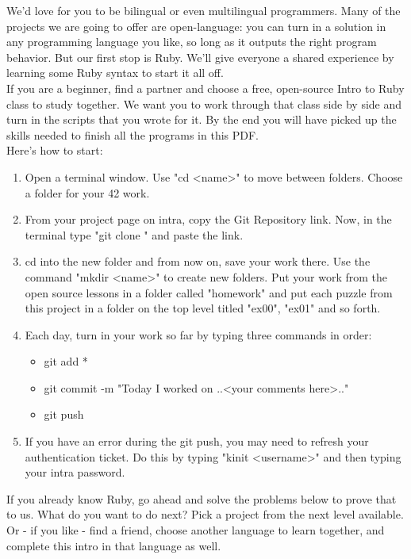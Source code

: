 \documentclass{42-en}
\begin{document}
We'd love for you to be bilingual or even multilingual programmers. Many of the projects we are going to offer are
open-language: you can turn in a solution in any programming language you like, so long as it outputs the right
program behavior. But our first stop is Ruby. We'll give everyone a shared experience by learning some Ruby syntax
to start it all off.\\

If you are a beginner, find a partner and choose a free, open-source Intro to Ruby class to study together.
We want you to work through that class side by side and turn in the scripts that you wrote for it. By the end you
will have picked up the skills needed to finish all the programs in this PDF.\\

Here's how to start:
\begin{enumerate}

	\item Open a terminal window. Use "cd <name>" to move between folders. Choose a folder for your 42 work.
	\item From your project page on intra, copy the Git Repository link. Now, in the terminal type "git clone " and paste the link.
	\item cd into the new folder and from now on, save your work there. Use the command "mkdir <name>" to create new folders. Put your work from the
	open source lessons in a folder called "homework" and put each puzzle from this project in a folder on the top level titled "ex00", "ex01" and so forth. 
	\item Each day, turn in your work so far by typing three commands in order: 
	\begin{itemize}
		\item git add *
		\item git commit -m "Today I worked on ..<your comments here>.."
		\item git push
	\end{itemize}
	\item If you have an error during the git push, you may need to refresh your authentication ticket. Do this by typing "kinit <username>" and then typing your intra password.

\end{enumerate}

If you already know Ruby, go ahead and solve the problems below to prove that to us. What do you want to do next? Pick a project from
the next level available. Or - if you like - find a friend, choose another language to learn together, and complete this intro in that language as well. 
\end{document}

